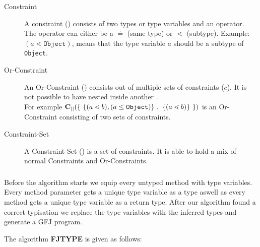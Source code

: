 \documentclass[a4paper,USenglish,cleveref, autoref, thm-restate]{lipics-v2021}
\begin{document}
\begin{description}
  \item[Constraint] A constraint (\constraint) consists of two types or type variables and an operator.
  The operator can either be a $\doteq$ (same type) or $\lessdot$ (subtype).
  Example: $(a \lessdot \mathtt{Object})$, means that the type variable $a$ should be a subtype of \texttt{Object}.
  \item[Or-Constraint] An Or-Constraint (\orCons{}) consists out of multiple sets of constraints ($c$).
  It is not possible to have \orCons{} nested inside another \orCons{}.\\
  For example $\textbf{C}_{||}{}(\{ \ \{ (a \lessdot b), (a \leq \mathtt{Object}) \} \ , \ \{ (a \lessdot b)\} \ \})$
  is an Or-Constraint consisting of two sets of constraints.
  \item[Constraint-Set] A Constraint-Set (\consSet) is a set of constraints.
  It is able to hold a mix of normal Constraints and Or-Constraints.
  \end{description}
  

\subsubsection{\fjtype{}}
Before the algorithm starts we equip every untyped method with type variables.
Every method parameter gets a unique type variable as a type aswell as every method gets a unique type variable as a return type.
After our algorithm found a correct typisation we replace the type variables with the inferred types and generate a GFJ program.

The algorithm \textbf{FJTYPE} is given as follows:
\end{document}
